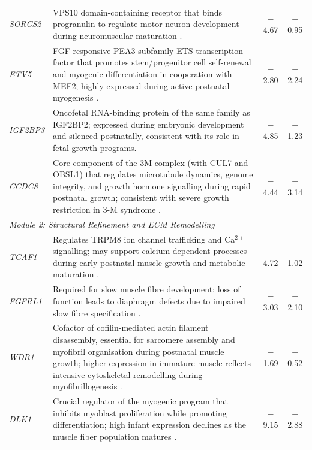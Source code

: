 \begin{landscape}
\begin{table}[p]
\begin{tabularx}{\linewidth}{lXcc}
    \textit{SORCS2} & VPS10 domain-containing receptor that binds progranulin to regulate motor neuron development during neuromuscular maturation \parencite{thomasen_sorcs2_2023}. & $-$4.67 & $-$0.95 \\

    \textit{ETV5} & FGF-responsive PEA3-subfamily ETS transcription factor that promotes stem/progenitor cell self-renewal and myogenic differentiation in cooperation with MEF2; highly expressed during active postnatal myogenesis \parencite{taylor_role_1997}. & $-$2.80 & $-$2.24 \\

    \textit{IGF2BP3} & Oncofetal RNA-binding protein of the same family as IGF2BP2; expressed during embryonic development and silenced postnatally, consistent with its role in fetal growth programs. & $-$4.85 & $-$1.23 \\

    \textit{CCDC8} & Core component of the 3M complex (with CUL7 and OBSL1) that regulates microtubule dynamics, genome integrity, and growth hormone signalling during rapid postnatal growth; consistent with severe growth restriction in 3-M syndrome \parencite{hanson_exome_2011}. & $-$4.44 & $-$3.14 \\
    \midrule
    \multicolumn{4}{l}{\textit{Module 2: Structural Refinement and ECM Remodelling}} \\
    \textit{TCAF1} & Regulates TRPM8 ion channel trafficking and Ca$^{2+}$ signalling; may support calcium-dependent processes during early postnatal muscle growth and metabolic maturation \parencite{gkika_trp_2015}. & $-$4.72 & $-$1.02 \\

    \textit{FGFRL1} & Required for slow muscle fibre development; loss of function leads to diaphragm defects due to impaired slow fibre specification \parencite{amann_fgfrl1_2014}. & $-$3.03 & $-$2.10 \\

    \textit{WDR1} & Cofactor of cofilin-mediated actin filament disassembly, essential for sarcomere assembly and myofibril organisation during postnatal muscle growth; higher expression in immature muscle reflects intensive cytoskeletal remodelling during myofibrillogenesis \parencite{ono_functions_2018}. & $-$1.69 & $-$0.52 \\

    \textit{DLK1} & Crucial regulator of the myogenic program that inhibits myoblast proliferation while promoting differentiation; high infant expression declines as the muscle fiber population matures \parencite{waddell_dlk1_2010,andersen_dual_2013}. & $-$9.15 & $-$2.88 \\


\end{tabularx}
\end{table}
\end{landscape}
